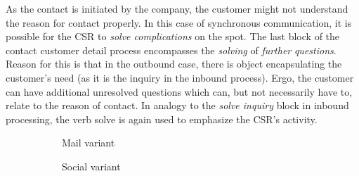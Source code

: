 	 As the contact is initiated by the company, the customer might not understand the reason for contact properly. In this case of synchronous communication, it is possible for the \acrshort{CSR} to\textit{ solve complications} on the spot. The last block of the contact customer detail process encompasses the \textit{solving} of \textit{further} \textit{questions}. Reason for this is that in the outbound case, there is object encapsulating the customer's need (as it is the inquiry in the inbound process). Ergo, the customer can have additional unresolved questions which can, but not necessarily have to, relate to the reason of contact. In analogy to the \textit{solve inquiry} block in inbound processing, the verb solve is again used to emphasize the \acrshort{CSR}'s activity. 
	 
	 
	 \begin{figure}[caption={contact customer detail process}, label={fig:outbound:con}]
	 	
	 	\begin{subfigure}[b]{.45\textwidth}
	 		\centering
	 		
	 		\caption{Mail variant}\label{fig:outbound:con:mail}
	 	\end{subfigure}
	 	\begin{subfigure}[b]{.45\textwidth}
	 		\centering	
	 		\caption{Social variant}\label{fig:outbound:con:social}
	 	\end{subfigure}
	 	\begin{subfigure}[b]{.45\textwidth}
	 		\centering	
\end{subfigure}
\end{figure}
